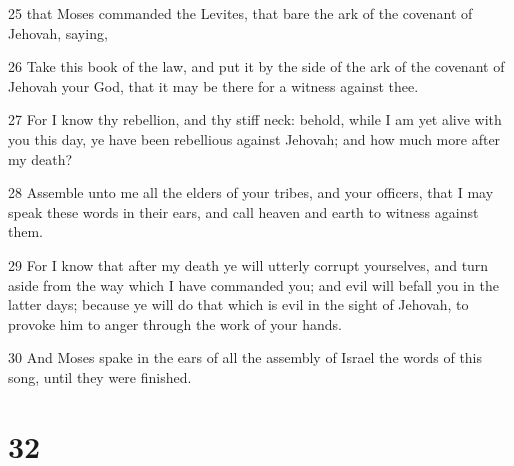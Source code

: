 \par 25 that Moses commanded the Levites, that bare the ark of the covenant of Jehovah, saying,
\par 26 Take this book of the law, and put it by the side of the ark of the covenant of Jehovah your God, that it may be there for a witness against thee.
\par 27 For I know thy rebellion, and thy stiff neck: behold, while I am yet alive with you this day, ye have been rebellious against Jehovah; and how much more after my death?
\par 28 Assemble unto me all the elders of your tribes, and your officers, that I may speak these words in their ears, and call heaven and earth to witness against them.
\par 29 For I know that after my death ye will utterly corrupt yourselves, and turn aside from the way which I have commanded you; and evil will befall you in the latter days; because ye will do that which is evil in the sight of Jehovah, to provoke him to anger through the work of your hands.
\par 30 And Moses spake in the ears of all the assembly of Israel the words of this song, until they were finished.

\chapter{32}

